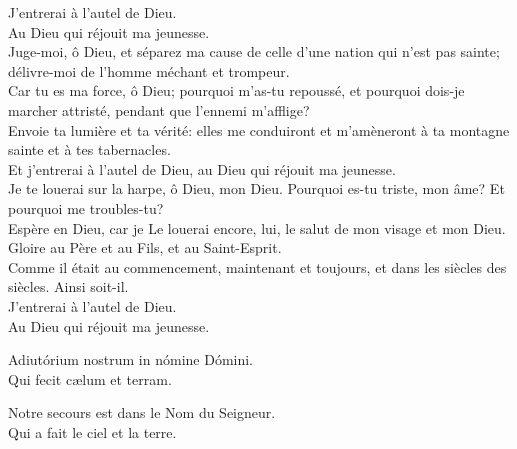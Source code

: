 \documentclass[twoside]{article}
\begin{document}
\begin{paracol}{2}
\vv J'entrerai à l'autel de Dieu.\\
\rr Au Dieu qui réjouit ma jeunesse.\\
\vv Juge-moi, ô Dieu, et séparez ma cause de celle d'une nation qui n'est pas sainte; délivre-moi de l'homme méchant et trompeur.\\
\rr Car tu es ma force, ô Dieu; pourquoi m'as-tu repoussé, et pourquoi dois-je marcher attristé, pendant que l'ennemi m'afflige?\\
\vv Envoie ta lumière et ta vérité: elles me conduiront et m'amèneront à ta montagne sainte et à tes tabernacles.\\
\rr Et j'entrerai à l'autel de Dieu, au Dieu qui réjouit ma jeunesse.\\
\vv Je te louerai sur la harpe, ô Dieu, mon Dieu. Pourquoi es-tu triste, mon âme? Et pourquoi me troubles-tu?\\
\rr Espère en Dieu, car je Le louerai encore, lui, le salut de mon visage et mon Dieu.\\
\vv Gloire au Père et au Fils, et au Saint-Esprit.\\
\rr Comme il était au commencement, maintenant et toujours, et dans les siècles des siècles. Ainsi soit-il.\\
\vv J'entrerai à l'autel de Dieu.\\
\rr Au Dieu qui réjouit ma jeunesse.

\switchcolumn*

\vv Adiutórium nostrum \cc in nómine Dómini.\\
\rr Qui fecit cælum et terram.

\switchcolumn

\vv Notre secours est dans le Nom du Seigneur.\\
\rr Qui a fait le ciel et la terre.

\switchcolumn*


\end{paracol}
\end{document}
